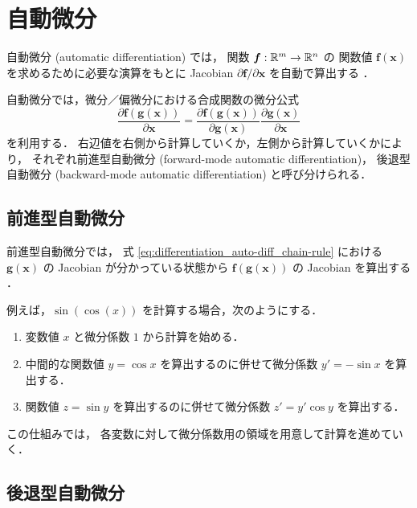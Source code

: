 %

\chapter{自動微分}

自動微分 (automatic differentiation) では，
関数 $\bm{f} : \mathbb{R}^m \to \mathbb{R}^n$ の
関数値 $\bm{f}(\bm{x})$ を求めるために必要な演算をもとに
Jacobian $\partial \bm{f} / \partial \bm{x}$ を自動で算出する
\cite{Kubota1998}．

自動微分では，微分／偏微分における合成関数の微分公式
\begin{equation}
    \frac{\partial \bm{f}(\bm{g}(\bm{x}))}{\partial \bm{x}}
    = \frac{\partial \bm{f}(\bm{g}(\bm{x}))}{\partial \bm{g}(\bm{x})}
    \frac{\partial \bm{g}(\bm{x})}{\partial \bm{x}}
    \label{eq:differentiation_auto-diff_chain-rule}
\end{equation}
を利用する．
右辺値を右側から計算していくか，左側から計算していくかにより，
それぞれ前進型自動微分 (forward-mode automatic differentiation)，
後退型自動微分 (backward-mode automatic differentiation) と呼び分けられる．

\section{前進型自動微分}

前進型自動微分では，
式 \eqref{eq:differentiation_auto-diff_chain-rule} における
$\bm{g}(\bm{x})$ の Jacobian が分かっている状態から
$\bm{f}(\bm{g}(\bm{x}))$ の Jacobian を算出する
\cite{Kubota1998}．

例えば，$\sin(\cos(x))$ を計算する場合，次のようにする．

\begin{enumerate}
    \item 変数値 $x$ と微分係数 $1$ から計算を始める．
    \item 中間的な関数値 $y = \cos{x}$ を算出するのに併せて微分係数 $y' = -\sin{x}$ を算出する．
    \item 関数値 $z = \sin{y}$ を算出するのに併せて微分係数 $z' = y' \cos{y}$ を算出する．
\end{enumerate}

この仕組みでは，
各変数に対して微分係数用の領域を用意して計算を進めていく．

\section{後退型自動微分}

